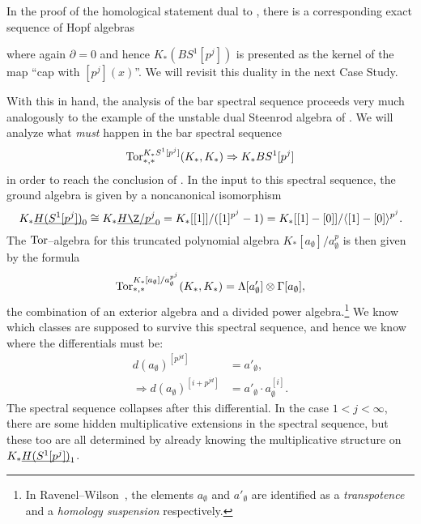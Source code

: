 \begin{remark}\label{KHomologyOfClassifyingSpace}
In the proof of the homological statement dual to , there is a corresponding exact sequence of Hopf algebras
\begin{center}
\end{center}
where again $\partial = 0$ and hence $K_*(BS^1[p^j])$ is presented as the kernel of the map ``cap with $[p^j](x)$''.  We will revisit this duality in the next Case Study.
\end{remark}

With this in hand, the analysis of the bar spectral sequence proceeds very much analogously to the example of the unstable dual Steenrod algebra of .  We will analyze what \emph{must} happen in the bar spectral sequence \[\operatorname{Tor}^{K_* S^1[p^j]}_{*, *}(K_*, K_*) \Rightarrow K_* BS^1[p^j]\] in order to reach the conclusion of .  In the input to this spectral sequence, the ground algebra is given by a noncanonical isomorphism \[K_* \OS{H(S^1[p^j])}{0} \cong K_* \OS{H\Z/p^j}{0} = K_*[[1]] / ([1]^{p^j} - 1) = K_*[[1] - [0]] / \<[1] - [0]\>^{p^j}.\]  The $\operatorname{Tor}$--algebra for this truncated polynomial algebra $K_*[a_\emptyset] / a_\emptyset^{p}$ is then given by the formula \[\operatorname{Tor}^{K_*[a_\emptyset] / a_\emptyset^{p^j}}_{*, *}(K_*, K_*) = \Lambda[a'_\emptyset] \otimes \Gamma[a_\emptyset],\] the combination of an exterior algebra and a divided power algebra.\footnote{In Ravenel--Wilson~\cite[Lemma 6.6]{RavenelWilsonKthyOfEMSpaces}, the elements $a_\emptyset$ and $a'_\emptyset$ are identified as a \textit{transpotence} and a \textit{homology suspension} respectively.}  We know which classes are supposed to survive this spectral sequence, and hence we know where the differentials must be:
\begin{align*}
d(a_\emptyset)^{[p^{jd}]} & = a'_\emptyset, \\
\Rightarrow d(a_\emptyset)^{[i + p^{jd}]} & = a'_\emptyset \cdot a_\emptyset^{[i]}.
\end{align*}
The spectral sequence collapses after this differential.  In the case $1 < j < \infty$, there are some hidden multiplicative extensions in the spectral sequence, but these too are all determined by already knowing the multiplicative structure on $K_* \underline{\smash{H(S^1[p^j])}}_{1}$.

